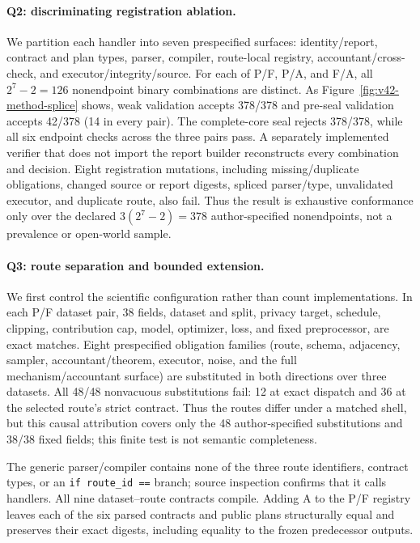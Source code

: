 \documentclass[letterpaper]{article}
\begin{document}
\paragraph{Q2: discriminating registration ablation.}
We partition each handler into seven prespecified surfaces: identity/report,
contract and plan types, parser, compiler, route-local registry,
accountant/cross-check, and executor/integrity/source.  For each of P/F, P/A,
and F/A, all $2^7-2=126$ nonendpoint binary combinations are distinct.  As
Figure~\ref{fig:v42-method-splice} shows, weak validation accepts 378/378
and pre-seal validation accepts 42/378 (14 in every pair).  The complete-core
seal rejects 378/378, while all six endpoint checks across the three pairs pass.
A separately
implemented verifier that does not import the report builder reconstructs
every combination and decision.  Eight registration mutations, including
missing/duplicate obligations, changed source or report digests, spliced
parser/type, unvalidated executor, and duplicate route, also fail.
Thus the result is exhaustive conformance only over the declared
$3(2^7-2)=378$ author-specified nonendpoints, not a prevalence or open-world
sample.

\paragraph{Q3: route separation and bounded extension.}
We first control the scientific configuration rather than count
implementations.  In each P/F dataset pair, 38 fields, dataset and split,
privacy target, schedule,
clipping, contribution cap, model, optimizer, loss, and fixed preprocessor,
are exact matches.  Eight prespecified obligation families (route, schema,
adjacency, sampler, accountant/theorem, executor, noise, and the full
mechanism/accountant surface) are substituted in both directions over three
datasets.  All 48/48 nonvacuous substitutions fail: 12 at exact dispatch and
36 at the selected route's strict contract.  Thus the routes differ under a
matched shell, but this causal attribution covers only the 48 author-specified
substitutions and 38/38 fixed fields; this finite test is not semantic
completeness.

The generic parser/compiler contains none of the three route identifiers,
contract types, or an \texttt{if route\_id ==} branch; source inspection
confirms that it calls handlers.  All nine dataset--route contracts compile.
Adding A to the P/F registry leaves each of the six parsed contracts and
public plans structurally equal and preserves their exact digests, including
equality to the frozen predecessor outputs.
\end{document}
